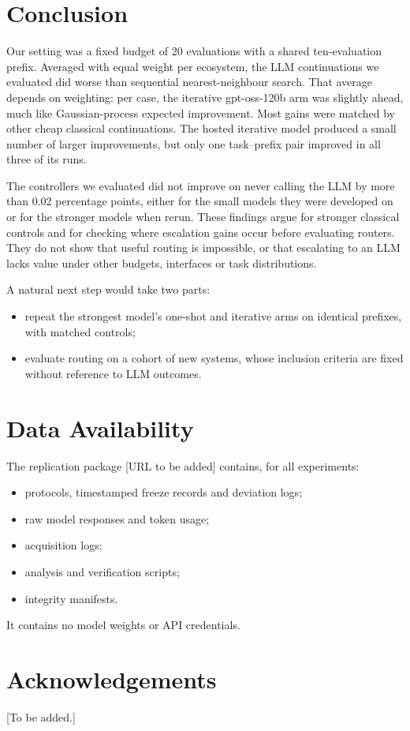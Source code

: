 \section{Conclusion}

Our setting was a fixed budget of 20 evaluations with a shared ten-evaluation prefix. Averaged with equal weight per ecosystem, the LLM continuations we evaluated did worse than sequential nearest-neighbour search. That average depends on weighting: per case, the iterative gpt-oss-120b arm was slightly ahead, much like Gaussian-process expected improvement. Most gains were matched by other cheap classical continuations. The hosted iterative model produced a small number of larger improvements, but only one task--prefix pair improved in all three of its runs.

The controllers we evaluated did not improve on never calling the LLM by more than 0.02 percentage points, either for the small models they were developed on or for the stronger models when rerun. These findings argue for stronger classical controls and for checking where escalation gains occur before evaluating routers. They do not show that useful routing is impossible, or that escalating to an LLM lacks value under other budgets, interfaces or task distributions.

A natural next step would take two parts:
\begin{itemize}
  \item repeat the strongest model's one-shot and iterative arms on identical prefixes, with matched controls;
  \item evaluate routing on a cohort of new systems, whose inclusion criteria are fixed without reference to LLM outcomes.
\end{itemize}

\section*{Data Availability}

The replication package [URL to be added] contains, for all experiments:
\begin{itemize}
  \item protocols, timestamped freeze records and deviation logs;
  \item raw model responses and token usage;
  \item acquisition logs;
  \item analysis and verification scripts;
  \item integrity manifests.
\end{itemize}
It contains no model weights or API credentials.

\section*{Acknowledgements}

[To be added.]





